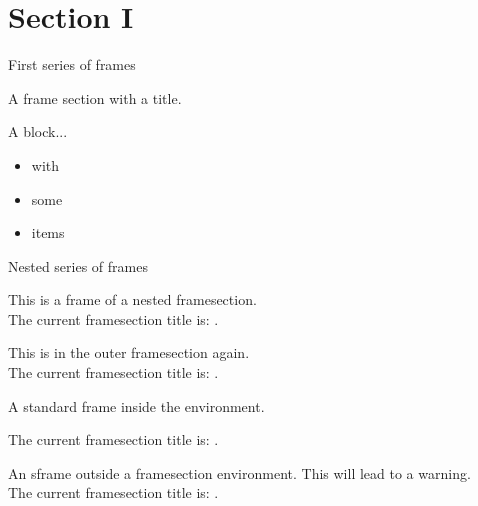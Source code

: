 \documentclass{beamer}
\begin{document}
\section*{Section I}

\begin{framesection}{First series of frames}
  \begin{sframe}
    A frame section with a title.
  \end{sframe}

  \begin{sframe}
    \begin{block}{A block...}
        \begin{itemize}
          \item with 
          \item some
          \item items
        \end{itemize}
    \end{block}
  \end{sframe}

  \begin{framesection}{Nested series of frames}
    \begin{sframe}
      This is a frame of a nested framesection.\\
      The current framesection title is: \insertframesection.
    \end{sframe}
  \end{framesection}

  \begin{sframe}
    This is in the outer framesection again.\\
    The current framesection title is: \insertframesection.
  \end{sframe}

  \begin{frame}
    A standard frame inside the environment.

    The current framesection title is: \insertframesection.
  \end{frame}
\end{framesection}

\begin{sframe}
  An sframe outside a framesection environment.
  This will lead to a warning.\\
  The current framesection title is: \insertframesection.
\end{sframe}
\end{document}
